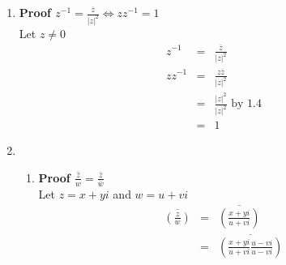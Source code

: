 \documentclass{article}%
\newcommand\abs[1]{\left|#1\right|}
\newenvironment{proof}[1][]{\begin{samepage}\textbf{Proof #1} }{\end{samepage}}
\begin{document}
\begin{enumerate}
\begin{enumerate}[label*=\arabic*.]
\begin{enumerate}[label=\alph*]
\begin{proof}[$\abs{zw}=\abs{z}\abs{w}$]
            \end{proof}
            \item
            \begin{proof}[$\abs{z}=\abs{\overline{z}}$]
                \\ Let $z=x+yi$
                \begin{eqnarray*}
                    \abs{z}&=&\abs{x+yi} \\
                           &=&\sqrt{x^2+y^2} \\
                    \abs{\overline{z}}&=&\abs{\overline{x+yi}} \\
                                      &=&\abs{x-yi} \\
                                      &=&\sqrt{x^2+y^2} \\
                    \abs{z}&=&\abs{\overline{z}} 
                \end{eqnarray*}
            \end{proof}
        \end{enumerate}
        \item %
        \begin{proof}[$z^{-1}=\frac{\overline{z}}{\abs{z}^2} \Leftrightarrow z z^{-1}=1$]
            \\ Let $z\neq0$
            \begin{eqnarray*}
                z^{-1}&=&\frac{\overline{z}}{\abs{z}^2} \\
                zz^{-1}&=&\frac{z\overline{z}}{\abs{z}^2} \\
                       &=&\frac{\abs{z}^2}{\abs{z}^2} \text{ by 1.4} \\
                       &=&1
            \end{eqnarray*}
        \end{proof}
        \item %
        \begin{enumerate}[label=\alph*]
            \item %
            \begin{proof}[$\overline{\frac{z}{w}}=\frac{\bar{z}}{\bar{w}}$]
                \\ Let $z=x+yi$ and $w=u+vi$
                \begin{eqnarray*}
                    \overline{(\frac{z}{w})}&=&\overline{(\frac{x+yi}{u+vi})} \\
                                            &=&\overline{(\frac{x+yi}{u+vi}\frac{u-vi}{u-vi})} \\

\end{eqnarray*}
\end{proof}
\end{enumerate}
\end{enumerate}
\end{enumerate}
\end{document}
